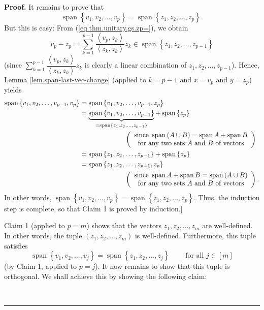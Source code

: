 \documentclass[numbers=enddot,12pt,final,onecolumn,notitlepage]{scrartcl}%
\numberwithin{exer}{subsection}
\theoremstyle{definition}
\newenvironment{proof}[1][Proof]{\noindent\textbf{#1.} }{\ \rule{0.5em}{0.5em}}
\let\sumnonlimits\sum
\renewcommand{\sum}{\sumnonlimits\limits}
\begin{document}
\begin{proof}
It remains to prove that
\[
\operatorname*{span}\left\{  v_{1},v_{2},\ldots,v_{p}\right\}
=\operatorname*{span}\left\{  z_{1},z_{2},\ldots,z_{p}\right\}  .
\]
But this is easy: From (\ref{eq.thm.unitary.gs.zp=}), we obtain%
\[
v_{p}-z_{p}=\sum_{k=1}^{p-1}\dfrac{\left\langle v_{p},z_{k}\right\rangle
}{\left\langle z_{k},z_{k}\right\rangle }z_{k}\in\operatorname*{span}\left\{
z_{1},z_{2},\ldots,z_{p-1}\right\}
\]
(since $\sum_{k=1}^{p-1}\dfrac{\left\langle v_{p},z_{k}\right\rangle
}{\left\langle z_{k},z_{k}\right\rangle }z_{k}$ is clearly a linear
combination of $z_{1},z_{2},\ldots,z_{p-1}$). Hence, Lemma
\ref{lem.span-last-vec-change} (applied to $k=p-1$ and $x=v_{p}$ and $y=z_{p}%
$) yields%
\begin{align*}
\operatorname*{span}\left\{  v_{1},v_{2},\ldots,v_{p-1},v_{p}\right\}   &
=\operatorname*{span}\left\{  v_{1},v_{2},\ldots,v_{p-1},z_{p}\right\} \\
&  =\underbrace{\operatorname*{span}\left\{  v_{1},v_{2},\ldots,v_{p-1}%
\right\}  }_{=\operatorname*{span}\left\{  z_{1},z_{2},\ldots,z_{p-1}\right\}
}+\operatorname*{span}\left\{  z_{p}\right\} \\
&  \ \ \ \ \ \ \ \ \ \ \ \ \ \ \ \ \ \ \ \ \left(
\begin{array}
[c]{c}%
\text{since }\operatorname*{span}\left(  A\cup B\right)  =\operatorname*{span}%
A+\operatorname*{span}B\\
\text{for any two sets }A\text{ and }B\text{ of vectors}%
\end{array}
\right) \\
&  =\operatorname*{span}\left\{  z_{1},z_{2},\ldots,z_{p-1}\right\}
+\operatorname*{span}\left\{  z_{p}\right\} \\
&  =\operatorname*{span}\left\{  z_{1},z_{2},\ldots,z_{p-1},z_{p}\right\} \\
&  \ \ \ \ \ \ \ \ \ \ \ \ \ \ \ \ \ \ \ \ \left(
\begin{array}
[c]{c}%
\text{since }\operatorname*{span}A+\operatorname*{span}B=\operatorname*{span}%
\left(  A\cup B\right) \\
\text{for any two sets }A\text{ and }B\text{ of vectors}%
\end{array}
\right)  .
\end{align*}
In other words, $\operatorname*{span}\left\{  v_{1},v_{2},\ldots
,v_{p}\right\}  =\operatorname*{span}\left\{  z_{1},z_{2},\ldots
,z_{p}\right\}  $. Thus, the induction step is complete, so that Claim 1 is
proved by induction.] \medskip

Claim 1 (applied to $p=m$) shows that the vectors $z_{1},z_{2},\ldots,z_{m}$
are well-defined. In other words, the tuple $\left(  z_{1},z_{2},\ldots
,z_{m}\right)  $ is well-defined. Furthermore, this tuple satisfies%
\[
\operatorname*{span}\left\{  v_{1},v_{2},\ldots,v_{j}\right\}
=\operatorname*{span}\left\{  z_{1},z_{2},\ldots,z_{j}\right\}
\ \ \ \ \ \ \ \ \ \ \text{for all }j\in\left[  m\right]
\]
(by Claim 1, applied to $p=j$). It now remains to show that this tuple is
orthogonal. We shall achieve this by showing the following claim:


\end{proof}
\end{document}
